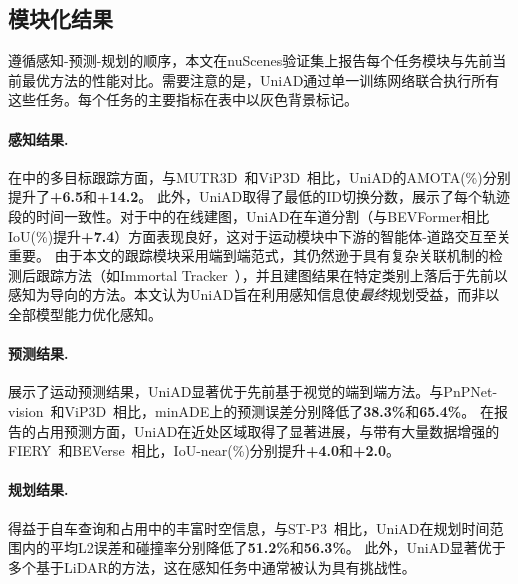 \documentclass[10pt,twocolumn,letterpaper]{article}
\begin{document}
\subsection{模块化结果}
\label{sec:exp-sota}
\vspace{-4pt}
遵循感知-预测-规划的顺序，本文在nuScenes验证集上报告每个任务模块与先前当前最优方法的性能对比。需要注意的是，UniAD通过单一训练网络联合执行所有这些任务。每个任务的主要指标在表中以灰色背景标记。

\vspace{-6pt}
\paragraph{感知结果.} 在中的多目标跟踪方面，与MUTR3D~\cite{zhang2022mutr3d}和ViP3D~\cite{gu2022vip3d}相比，UniAD的AMOTA(\%)分别提升了\textbf{+6.5}和\textbf{+14.2}。
%
此外，UniAD取得了最低的ID切换分数，展示了每个轨迹段的时间一致性。对于中的在线建图，UniAD在车道分割（与BEVFormer相比IoU(\%)提升\textbf{+7.4}）方面表现良好，这对于运动模块中下游的智能体-道路交互至关重要。
%
由于本文的跟踪模块采用端到端范式，其仍然逊于具有复杂关联机制的检测后跟踪方法（如Immortal Tracker~\cite{wang2021immortal}），并且建图结果在特定类别上落后于先前以感知为导向的方法。本文认为UniAD旨在利用感知信息使\textit{最终}规划受益，而非以全部模型能力优化感知。

\vspace{-6pt}
\paragraph{预测结果.} 展示了运动预测结果，UniAD显著优于先前基于视觉的端到端方法。与PnPNet-vision~\cite{liang2020pnpnet}和ViP3D~\cite{gu2022vip3d}相比，minADE上的预测误差分别降低了\textbf{38.3\%}和\textbf{65.4\%}。
%
在报告的占用预测方面，UniAD在近处区域取得了显著进展，与带有大量数据增强的FIERY~\cite{hu2021fiery}和BEVerse~\cite{zhang2022beverse}相比，IoU-near(\%)分别提升\textbf{+4.0}和\textbf{+2.0}。

\vspace{-6pt}
\paragraph{规划结果.} 得益于自车查询和占用中的丰富时空信息，与ST-P3~\cite{hu2022stp3}相比，UniAD在规划时间范围内的平均L2误差和碰撞率分别降低了\textbf{51.2\%}和\textbf{56.3\%}。
%
此外，UniAD显著优于多个基于LiDAR的方法，这在感知任务中通常被认为具有挑战性。 
\end{document}
